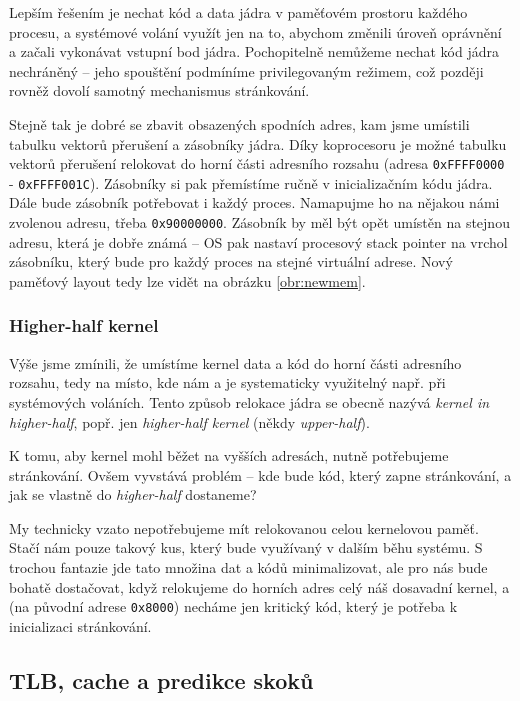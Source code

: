 \documentclass{article}
\begin{document}
Lepším řešením je nechat kód a data jádra v paměťovém prostoru každého procesu, a systémové volání využít jen na to, abychom změnili úroveň oprávnění a začali vykonávat vstupní bod jádra. Pochopitelně nemůžeme nechat kód jádra nechráněný -- jeho spouštění podmíníme privilegovaným režimem, což později rovněž dovolí samotný mechanismus stránkování.

Stejně tak je dobré se zbavit obsazených spodních adres, kam jsme umístili tabulku vektorů přerušení a zásobníky jádra. Díky koprocesoru je možné tabulku vektorů přerušení relokovat do horní části adresního rozsahu (adresa {\tt 0xFFFF0000} - {\tt 0xFFFF001C}). Zásobníky si pak přemístíme ručně v inicializačním kódu jádra. Dále bude zásobník potřebovat i každý proces. Namapujme ho na nějakou námi zvolenou adresu, třeba {\tt 0x90000000}. Zásobník by měl být opět umístěn na stejnou adresu, která je dobře známá -- OS pak nastaví procesový stack pointer na vrchol zásobníku, který bude pro každý proces na stejné virtuální adrese. Nový paměťový layout tedy lze vidět na obrázku \ref{obr:newmem}.

\subsubsection{Higher-half kernel}

Výše jsme zmínili, že umístíme kernel data a kód do horní části adresního rozsahu, tedy na místo, kde nám  a je systematicky využitelný např. při systémových voláních. Tento způsob relokace jádra se obecně nazývá \emph{kernel in higher-half}, popř. jen \emph{higher-half kernel} (někdy \emph{upper-half}).

K tomu, aby kernel mohl běžet na vyšších adresách, nutně potřebujeme stránkování. Ovšem vyvstává problém -- kde bude kód, který zapne stránkování, a jak se vlastně do \emph{higher-half} dostaneme?

My technicky vzato nepotřebujeme mít relokovanou celou kernelovou paměť. Stačí nám pouze takový kus, který bude využívaný v dalším běhu systému. S trochou fantazie jde tato množina dat a kódů minimalizovat, ale pro nás bude bohatě dostačovat, když relokujeme do horních adres celý náš dosavadní kernel, a  (na původní adrese {\tt 0x8000}) necháme jen kritický kód, který je potřeba k inicializaci stránkování.

\subsection{TLB, cache a predikce skoků}
\end{document}
